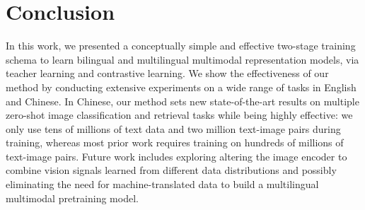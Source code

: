 \section{Conclusion}
In this work, we presented a conceptually simple and effective two-stage training schema to learn bilingual and multilingual multimodal representation models, via teacher learning and contrastive learning. We show the effectiveness of our method by conducting extensive experiments on a wide range of tasks in English and Chinese. In Chinese, our method sets new state-of-the-art results on multiple zero-shot image classification and retrieval tasks while being highly effective: we only use tens of millions of text data and two million text-image pairs during training, whereas most prior work requires training on hundreds of millions of text-image pairs. Future work includes exploring altering the image encoder to combine vision signals learned from different data distributions and possibly eliminating the need for machine-translated data to build a multilingual multimodal pretraining model.




